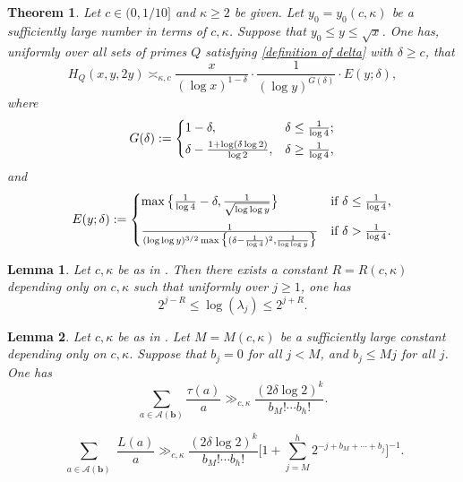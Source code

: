 \documentclass[10pt,a4paper]{amsart}
\newtheorem{theorem}{Theorem}
\newtheorem{lemma}{Lemma}
\newcommand{\density}{\delta}
\begin{document}
	\begin{theorem} \label{mainthm}
		Let $c \in (0,1/10]$ and $\kappa \ge 2$ be given. Let $y_0=y_0(c,\kappa)$ be a sufficiently large number in terms of $c,\kappa$. Suppose that ${y_0 \leq y \leq \sqrt{x}}$. One has, uniformly over all sets of primes $Q$ satisfying \eqref{definition of delta} with $\delta \ge c$, that
		\begin{equation}
			H_Q(x,y,2y) \asymp_{\kappa,c} \frac{x}{(\log x)^{1-\density}} \cdot \frac{1}{(\log y)^{G(\density)}} \cdot E(y;\density),
		\end{equation}
		where $$G(\density) := \begin{cases}
			1-\density, \quad &\density \leq \frac{1}{\log 4};\\
			\noalign{\vskip-12pt}\\
			\density -  \frac{1+\log(\density \log 2)}{\log 2}, & \density \geq \frac{1}{\log 4},
		\end{cases}$$
		and
		$$E(y;\density) := \begin{cases}
			\max\big\{\frac{1}{\log 4} - \density, \frac{1}{\sqrt{\log \log y}}\big\} & \text{if } \density \leq \frac{1}{\log 4}, \\
			\noalign{\vskip 5pt}
			\frac{1}{(\log \log y)^{3/2} \max\big\{(\density - \frac{1}{\log 4})^2, \frac{1}{\log \log y}\big\}} & \text{if } \density > \frac{1}{\log 4}.
		\end{cases}$$
	\end{theorem}

	\begin{lemma}\label{lem: size of lambda}
		Let $c,\kappa$ be as in . Then there exists a constant $R =R(c,\kappa)$ depending only on $c,\kappa$ such that uniformly over $j \geq 1$, one has
		$$2^{j-R} \leq \log(\lambda_j) \leq 2^{j+R}.$$
	\end{lemma}

	\begin{lemma}\label{LB tau} Let $c,\kappa$ be as in . Let $M = M(c,\kappa)$ be a sufficiently large constant depending only on $c,\kappa$. Suppose that $b_j = 0$ for all $j < M$, and $b_j \leq M j$ for all $j$. One has
		\begin{equation}
			\sum_{a \in \mathscr{A}(\bm{b})} \frac{\tau(a)}{a} \gg_{c,\kappa} \frac{(2 \density \log 2)^k}{b_M! \cdots b_h!}.
		\end{equation}
	\end{lemma}

	\begin{equation}\label{L to factorials}
		\sum_{\substack{a \in \mathscr{A}(\bm{b})}} \frac{L(a)}{a} \gg_{c,\kappa}  \frac{(2 \density \log 2)^k}{b_M! \cdots b_h!} \bigg[ 1 + \sum_{j =M}^h 2^{-j +b_M + \cdots +b_j} \bigg]^{-1}.
	\end{equation}
\end{document}
